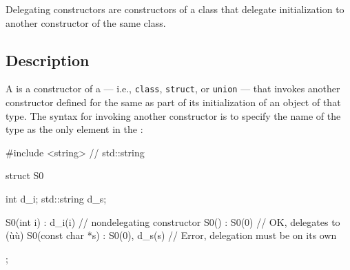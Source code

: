 


\setcounter{table}{0}
\setcounter{footnote}{0}
\setcounter{lstlisting}{0}

Delegating constructors are constructors of a class that delegate initialization to another
constructor of the same class.

\subsection[Description]{Description}\label{description}

A  is a constructor of a
 --- i.e., \lstinline!class!, \lstinline!struct!, or
\lstinline!union! --- that invokes another constructor defined for the same
 as part of its initialization of an object of that type.
The syntax for invoking another constructor is to specify
the name of the type as the only element in the :

%
\begin{emcppslisting}
#include <string>  // std::string

struct S0
{
  int         d_i;
  std::string d_s;

  S0(int i)         : d_i(i)        {} // nondelegating constructor
  S0()              : S0(0)         {} // OK, delegates to (ù{}ù)
  S0(const char *s) : S0(0), d_s(s) {} // Error, delegation must be on its own
};
\end{emcppslisting}

